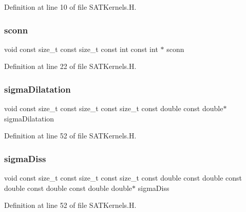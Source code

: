 Definition at line 10 of file S\+A\+T\+Kernels.\+H.

\hypertarget{SATKernels_8H_a09eb314e5f0d178313086632ffd7193e}{}\label{SATKernels_8H_a09eb314e5f0d178313086632ffd7193e} 
\subsubsection{\texorpdfstring{sconn}{sconn}}
{\footnotesize\ttfamily void const size\+\_\+t const size\+\_\+t const int const int $\ast$ sconn}



Definition at line 22 of file S\+A\+T\+Kernels.\+H.

\hypertarget{SATKernels_8H_a1657cf7729fe0b6d5d9a412ecab80002}{}\label{SATKernels_8H_a1657cf7729fe0b6d5d9a412ecab80002} 
\subsubsection{\texorpdfstring{sigma\+Dilatation}{sigmaDilatation}}
{\footnotesize\ttfamily void const size\+\_\+t const size\+\_\+t const size\+\_\+t const double const double$\ast$ sigma\+Dilatation}



Definition at line 52 of file S\+A\+T\+Kernels.\+H.

\hypertarget{SATKernels_8H_a4f33b7bbf46dad9ee0eb31f6a0340d7a}{}\label{SATKernels_8H_a4f33b7bbf46dad9ee0eb31f6a0340d7a} 
\subsubsection{\texorpdfstring{sigma\+Diss}{sigmaDiss}}
{\footnotesize\ttfamily void const size\+\_\+t const size\+\_\+t const size\+\_\+t const double const double const double const double const double double$\ast$ sigma\+Diss}



Definition at line 52 of file S\+A\+T\+Kernels.\+H.

\hypertarget{SATKernels_8H_a37f2683de24db9314043c0908d11292c}{}\label{SATKernels_8H_a37f2683de24db9314043c0908d11292c} 
